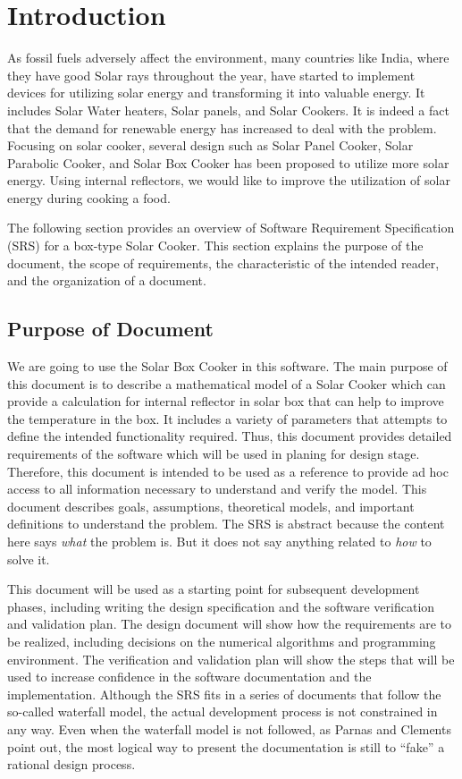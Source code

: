 \documentclass[12pt]{article}
\begin{document}
\section{Introduction}

As fossil fuels adversely affect the environment, many countries like India, where they have good Solar rays throughout the year, have started to implement devices for utilizing solar energy and transforming it into valuable energy. It includes Solar Water heaters, Solar panels, and Solar Cookers. It is indeed a fact that the demand for renewable energy has increased to deal with the problem. Focusing on solar cooker, several design such as Solar Panel Cooker, Solar Parabolic Cooker, and Solar Box Cooker has been proposed to utilize more solar energy. Using internal reflectors, we would like to improve the utilization of solar energy during cooking a food.   

The following section provides an overview of Software Requirement Specification (SRS) for a box-type Solar Cooker. This section explains the purpose of the document, the scope of requirements, the characteristic of the intended reader, and the organization of a document.   


\subsection{Purpose of Document}

We are going to use the Solar Box Cooker in this software. The main purpose of this document is to describe a mathematical model of a Solar Cooker which can provide a calculation for internal reflector in solar box that can help to improve the temperature in the box. It includes a variety of parameters that attempts to define the intended functionality required. Thus, this document provides detailed requirements of the software which will be used in planing for design stage. Therefore, this document is intended to be used as a reference to provide ad hoc access to all information necessary to understand and verify the model. This document describes goals, assumptions, theoretical models, and important definitions to understand the problem. The SRS is abstract because the content here says \emph{what} the problem is. But it does not say anything related to \emph{how} to solve it.

This document will be used as a starting point for subsequent development 
phases, including writing the design specification and the software 
verification and validation plan. The design document will show how the 
requirements are to be realized, including decisions on the numerical 
algorithms and programming environment. The verification and validation plan 
will show the steps that will be used to increase confidence in the software 
documentation and the implementation. Although the SRS fits in a series of 
documents that follow the so-called waterfall model, the actual development 
process is not constrained in any way. Even when the waterfall model is not 
followed, as Parnas and Clements~\cite{ParnasAndClements} point out, the most logical way to 
present the documentation is still to “fake” a rational design process.
\end{document}
